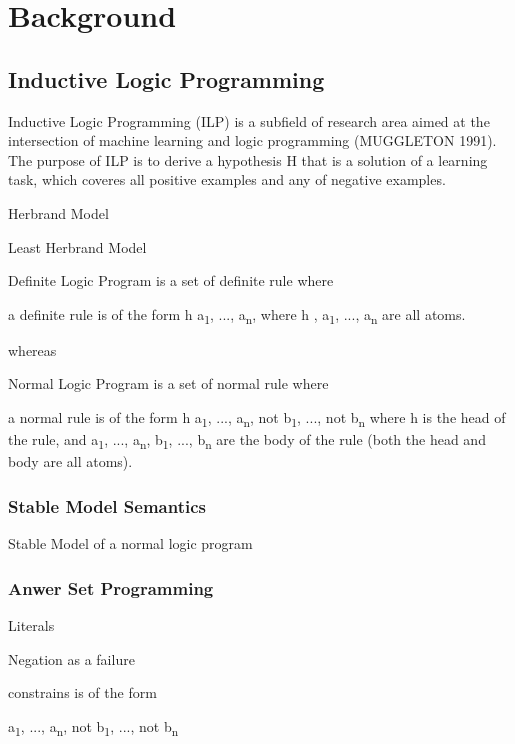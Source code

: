 \documentclass[12pt,twoside]{report}
\begin{document}
\chapter{Background}
\section{Inductive Logic Programming}
Inductive Logic Programming (ILP) is a subfield of research area aimed at the intersection of machine learning and logic programming (MUGGLETON 1991). The purpose of ILP is to derive a hypothesis H that is a solution of a learning task, which coveres all positive examples and any of negative examples.

Herbrand Model

Least Herbrand Model

Definite Logic Program is a set of definite rule where

\begin{theorem}
a definite rule is of the form h \leftarrow a\textsubscript{1}, ..., a\textsubscript{n}, where h , a\textsubscript{1}, ..., a\textsubscript{n} are all atoms.
\end{theorem}

whereas

Normal Logic Program is a set of normal rule where

\begin{theorem}
a normal rule is of the form h \leftarrow a\textsubscript{1}, ..., a\textsubscript{n}, not b\textsubscript{1}, ..., not b\textsubscript{n} where h is the head of the rule,
 and a\textsubscript{1}, ..., a\textsubscript{n}, b\textsubscript{1}, ..., b\textsubscript{n} are the body of the rule (both the head and body are all atoms).
\end{theorem}

\subsection{Stable Model Semantics}

Stable Model of a normal logic program

\subsection{Anwer Set Programming}

Literals

Negation as a failure

constrains is of the form
\begin{theorem}
\leftarrow a\textsubscript{1}, ..., a\textsubscript{n}, not b\textsubscript{1}, ..., not b\textsubscript{n}
\end{theorem}
\end{document}
